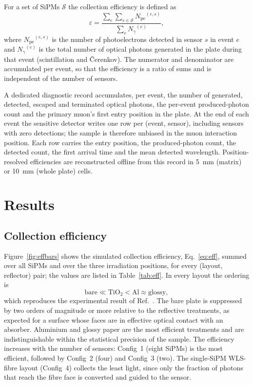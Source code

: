 \documentclass[3p]{elsarticle}
\newcommand{\pe}{\ensuremath{N_{\mathrm{pe}}}}
\newcommand{\ngam}{\ensuremath{N_{\gamma}}}
\newcommand{\eps}{\ensuremath{\varepsilon}}
\newcommand{\sipm}{SiPM}
\begin{document}
For a set of \sipm{}s $\mathcal{S}$ the collection efficiency is defined as
\begin{equation}
  \eps = \frac{\displaystyle\sum_{e}\sum_{s\in\mathcal{S}} \pe^{(e,s)}}
             {\displaystyle\sum_{e}\ngam^{(e)}},
  \label{eq:eff}
\end{equation}
where $\pe^{(e,s)}$ is the number of photoelectrons detected in sensor $s$ in
event $e$ and $\ngam^{(e)}$ is the total number of optical photons generated in
the plate during that event (scintillation and \v{C}erenkov). The numerator and
denominator are accumulated per event, so that the efficiency is a ratio of
sums and is independent of the number of sensors.

A dedicated diagnostic record accumulates, per event, the number of generated,
detected, escaped and terminated optical photons, the per-event produced-photon
count and the primary muon's first entry position in the plate. At the end of
each event the sensitive detector writes one row per (event, sensor), including
sensors with zero detections; the sample is therefore unbiased in the muon
interaction position. Each row carries the entry position, the produced-photon
count, the detected count, the first arrival time and the mean detected
wavelength. Position-resolved efficiencies are reconstructed offline from this
record in \SI{5}{\milli\meter} (matrix) or \SI{10}{\milli\meter} (whole plate)
cells.

\section{Results}
\label{sec:results}

\subsection{Collection efficiency}
\label{sec:eff}

Figure~\ref{fig:effbars} shows the simulated collection efficiency,
Eq.~\eqref{eq:eff}, summed over all \sipm{}s and over the three irradiation
positions, for every (layout, reflector) pair; the values are listed in
Table~\ref{tab:eff}. In every layout the ordering is
\begin{equation}
  \text{bare} \ll \text{TiO}_2 < \text{Al} \approx \text{glossy},
  \label{eq:ordering}
\end{equation}
which reproduces the experimental result of Ref.~\cite{Rao2025}. The bare plate
is suppressed by two orders of magnitude or more relative to the reflective
treatments, as expected for a surface whose faces are in effective optical
contact with an absorber. Aluminium and glossy paper are the most efficient
treatments and are indistinguishable within the statistical precision of the
sample. The efficiency increases with the number of sensors: Config~1 (eight
\sipm{}s) is the most efficient, followed by Config~2 (four) and Config~3
(two). The single-\sipm{} WLS-fibre layout (Config~4) collects the least light,
since only the fraction of photons that reach the fibre face is converted and
guided to the sensor.
\end{document}
